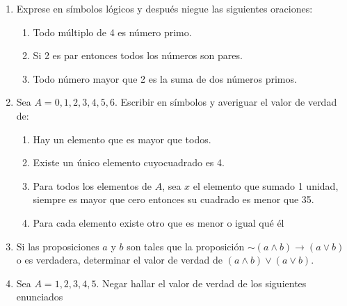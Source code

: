 {\begin{enumerate}
\begin{enumerate}
\item $p\vee\left(p\wedge q\right)\equiv p$
\item $p\wedge\left(p\vee q\right)\equiv p$
\item $\sim\left(p\vee q\right)\vee\left(\sim p\wedge q\right)\equiv\sim p$
\item $\sim\left(p\rightarrow\sim q\right)\leftrightarrow\left(p\wedge q\right)$
\item $\left(p\wedge\sim q\right)\rightarrow r\equiv\sim p\vee\left(q\vee r\right)$
\item $\left[\left\{ \left(p\rightarrow q\right)\wedge\left(p\rightarrow t\right)\right\} \vee\left\{ \left(r\rightarrow q\right)\wedge\left(r\rightarrow t\right)\right\} \right]\equiv\left[\left(p\wedge r\right)\rightarrow\left(q\wedge t\right)\right]$
\end{enumerate}
\item Exprese en símbolos lógicos y después niegue las siguientes oraciones: 

\begin{enumerate}
\item Todo múltiplo de 4 es número primo. 
\item Si 2 es par entonces todos los números son pares. 
\item Todo número mayor que 2 es la suma de dos números primos.
\end{enumerate}
\item Sea $A={0,1,2,3,4,5,6}$. Escribir en símbolos y averiguar el valor
de verdad de:

\begin{enumerate}
\item Hay un elemento que es mayor que todos. 
\item Existe un único elemento cuyocuadrado es 4. 
\item Para todos los elementos de $A$, sea $x$ el elemento que sumado
1 unidad, siempre es mayor que cero entonces su cuadrado es menor
que 35.
\item Para cada elemento existe otro que es menor o igual qué él 
\end{enumerate}
\item Si las proposiciones $a$ y $b$ son tales que la proposición $\sim(a\wedge b)\rightarrow(a\vee b)$
o es verdadera, determinar el valor de verdad de $(a\wedge b)\vee(a\vee b)$. 
\item Sea $A={1,2,3,4,5}$. Negar hallar el valor de verdad de los siguientes
enunciados 


\end{enumerate}}
